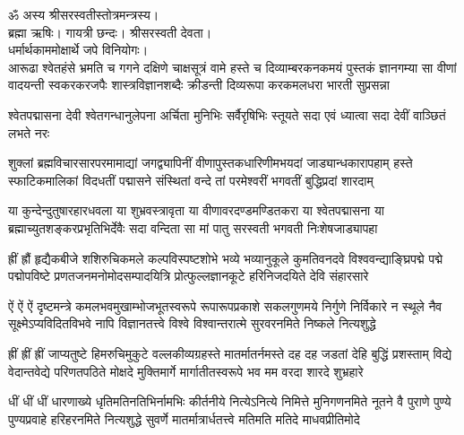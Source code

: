 
\setlength{\shlokaspaceskip}{12pt}
ॐ अस्य श्रीसरस्वतीस्तोत्रमन्त्रस्य।\\
ब्रह्मा ऋषिः। गायत्री छन्दः। श्रीसरस्वती देवता।\\
धर्मार्थकाममोक्षार्थे जपे विनियोगः।\\

\fourlineindentedshloka
{आरूढा श्वेतहंसे भ्रमति च गगने दक्षिणे चाक्षसूत्रं}
{वामे हस्ते च दिव्याम्बरकनकमयं पुस्तकं ज्ञानगम्या}
{सा वीणां वादयन्ती स्वकरकरजपैः शास्त्रविज्ञानशब्दैः}
{क्रीडन्ती दिव्यरूपा करकमलधरा भारती सुप्रसन्ना}

\threelineshloka
{श्वेतपद्मासना देवी श्वेतगन्धानुलेपना}
{अर्चिता मुनिभिः सर्वैरृषिभिः स्तूयते सदा}
{एवं ध्यात्वा सदा देवीं वाञ्छितं लभते नरः}

\resetShloka

\fourlineindentedshloka
{शुक्लां ब्रह्मविचारसारपरमामाद्यां जगद्व्यापिनीं}
{वीणापुस्तकधारिणीमभयदां जाड्यान्धकारापहाम्}
{हस्ते स्फाटिकमालिकां विदधतीं पद्मासने संस्थितां}
{वन्दे तां परमेश्वरीं भगवतीं बुद्धिप्रदां शारदाम्}

\fourlineindentedshloka
{या कुन्देन्दुतुषारहारधवला या शुभ्रवस्त्रावृता}
{या वीणावरदण्डमण्डितकरा या श्वेतपद्मासना}
{या ब्रह्माच्युतशङ्करप्रभृतिभिर्देवैः सदा वन्दिता}
{सा मां पातु सरस्वती भगवती निःशेषजाड्यापहा}

\fourlineindentedshloka
{ह्रीं ह्रौं हृद्यैकबीजे शशिरुचिकमले कल्पविस्पष्टशोभे}
{भव्ये भव्यानुकूले कुमतिवनदवे विश्ववन्द्याङ्घ्रिपद्मे}
{पद्मे पद्मोपविष्टे प्रणतजनमनोमोदसम्पादयित्रि}
{प्रोत्फुल्लज्ञानकूटे हरिनिजदयिते देवि संहारसारे}

\fourlineindentedshloka
{ऐं ऐं ऐं दृष्टमन्त्रे कमलभवमुखाम्भोजभूतस्वरूपे}
{रूपारूपप्रकाशे सकलगुणमये निर्गुणे निर्विकारे}
{न स्थूले नैव सूक्ष्मेऽप्यविदितविभवे नापि विज्ञानतत्त्वे}
{विश्वे विश्वान्तरात्मे सुरवरनमिते निष्कले नित्यशुद्धे}

\fourlineindentedshloka
{ह्रीं ह्रीं ह्रीं जाप्यतुष्टे हिमरुचिमुकुटे वल्लकीव्यग्रहस्ते}
{मातर्मातर्नमस्ते दह दह जडतां देहि बुद्धिं प्रशस्ताम्}
{विद्ये वेदान्तवेद्ये परिणतपठिते मोक्षदे मुक्तिमार्गे}
{मार्गातीतस्वरूपे भव मम वरदा शारदे शुभ्रहारे}

\fourlineindentedshloka
{धीं धीं धीं धारणाख्ये धृतिमतिनतिभिर्नामभिः कीर्तनीये}
{नित्येऽनित्ये निमित्ते मुनिगणनमिते नूतने वै पुराणे}
{पुण्ये पुण्यप्रवाहे हरिहरनमिते नित्यशुद्धे सुवर्णे}
{मातर्मात्रार्धतत्त्वे मतिमति मतिदे माधवप्रीतिमोदे}

